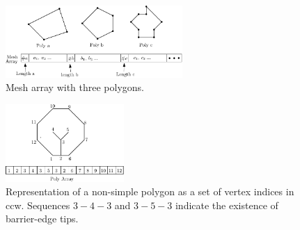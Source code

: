 \documentclass[lineno,pdflatex,sn-mathphys]{sn-jnl}%
\theoremstyle{thmstyleone}%
\theoremstyle{thmstyletwo}%
\theoremstyle{thmstylethree}%
\begin{document}
\begin{figure}[]
    \centering
\includegraphics[width=0.6\textwidth]{meshdatastruct}
    \caption{Mesh array with three polygons.} 
    \label{fig:meshdatastruct}
\end{figure}


\begin{figure}
\centering     %
\includegraphics[width=0.4\textwidth]{polyarray} 
\caption{Representation of a  non-simple polygon as a set of vertex indices in ccw. Sequences $3 - 4 - 3$ and $3 - 5 - 3$ indicate the existence of barrier-edge tips.}%
\label{fig:poly_array_representation} 
\end{figure}






\end{document}
